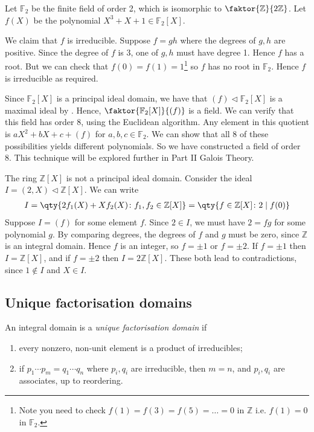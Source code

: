 \begin{example}
	Let $\mathbb F_2$ be the finite field of order 2, which is isomorphic to $\faktor{\mathbb Z}{2 \mathbb Z}$.
	Let $f(X)$ be the polynomial $X^3 + X + 1 \in \mathbb F_2[X]$.

	We claim that $f$ is irreducible.
	Suppose $f = gh$ where the degrees of $g, h$ are positive.
	Since the degree of $f$ is 3, one of $g, h$ must have degree 1.
	Hence $f$ has a root.
	But we can check that $f(0) = f(1) = 1$\footnote{Note you need to check $f(1) = f(3) = f(5) = \dots = 0$ in $\mathbb{Z}$ i.e. $f(1) = 0$ in $\mathbb{F}_2$.} so $f$ has no root in $\mathbb F_2$.
	Hence $f$ is irreducible as required.

	Since $\mathbb F_2[X]$ is a principal ideal domain, we have that $(f) \triangleleft \mathbb F_2[X]$ is a maximal ideal by .
	Hence, $\faktor{\mathbb F_2[X]}{(f)}$ is a field.
	We can verify that this field has order 8, using the Euclidean algorithm.
	Any element in this quotient is $aX^2 + bX + c + (f)$ for $a,b,c \in \mathbb F_2$.
	We can show that all 8 of these possibilities yields different polynomials.
	So we have constructed a field of order 8.
	This technique will be explored further in Part II Galois Theory.
\end{example}

\begin{example}
	The ring $\mathbb Z[X]$ is not a principal ideal domain.
	Consider the ideal $I = (2, X) \triangleleft \mathbb Z[X]$.
	We can write
	\begin{align*}
		I = \qty{2f_1(X) + Xf_2(X) \colon f_1, f_2 \in \mathbb Z[X]} = \qty{f \in \mathbb Z[X] \colon 2\mid f(0)}
	\end{align*}
	Suppose $I = (f)$ for some element $f$.
	Since $2 \in I$, we must have $2 = fg$ for some polynomial $g$.
	By comparing degrees, the degrees of $f$ and $g$ must be zero, since $\mathbb Z$ is an integral domain.
	Hence $f$ is an integer, so $f = \pm 1$ or $f = \pm 2$.
	If $f = \pm 1$ then $I = \mathbb Z[X]$, and if $f = \pm 2$ then $I = 2\mathbb Z[X]$.
	These both lead to contradictions, since $1 \not\in I$ and $X \in I$.
\end{example}

\subsection{Unique factorisation domains}

\begin{definition}
	An integral domain is a \textit{unique factorisation domain} if
	\begin{enumerate}
		\item every nonzero, non-unit element is a product of irreducibles;
		\item if $p_1 \cdots p_m = q_1 \cdots q_n$ where $p_i, q_i$ are irreducible, then $m = n$, and $p_i, q_i$ are associates, up to reordering.
	\end{enumerate}
\end{definition}

